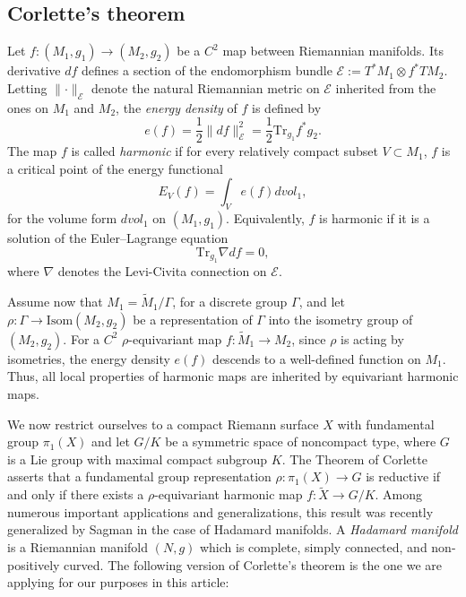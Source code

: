 \documentclass[oneside,11pt]{amsart}
\makeatletter
\theoremstyle{definition}
\theoremstyle{remark}
\let\origsection\section
\renewcommand\section{\@ifstar{\starsection}{\nostarsection}}
\newcommand\nostarsection[1]
{\sectionprelude\origsection{#1}\sectionpostlude}
\newcommand\starsection[1]
{\sectionprelude\origsection*{#1}\sectionpostlude}
\newcommand\sectionprelude{%
  \vspace{1em}
}
\newcommand\sectionpostlude{%
  \vspace{1em}
}
\numberwithin{thm}{section}
\numberwithin{equation}{section}
\makeatother
\begin{document}

\newpage
\appendix


\section{From representations to Higgs bundles.}\label{sec:Corlette_Hadamard}

\subsection{Corlette's theorem}
Let $f\colon (M_1, g_1) \to (M_2, g_2)$ 
be a $C^2$ map between Riemannian manifolds. Its derivative $df$ defines a section of the endomorphism bundle $\mathcal{E}:=T^*M_1 \otimes f^*TM_2$. Letting $\lVert \cdot \rVert _{\mathcal{E}}$ denote the natural Riemannian metric on $\mathcal{E}$ inherited from the ones on $M_1$ and $M_2$, the \emph{energy density} of $f$ is defined by 
\[e(f)=\frac{1}{2}\lVert df \rVert _{\mathcal{E}}^2=\frac{1}{2} \mathrm{Tr}_{g_1}f^*g_2.\]
The map $f$ is called \emph{harmonic} if for every relatively compact subset $V \subset M_1$, $f$ is a critical point of the energy functional
\[E_V(f)= \int_{V}e(f)dvol_1 , \]
for the volume form $dvol_1$ on $(M_1,g_1)$. Equivalently, $f$ is harmonic if it is a solution of the Euler--Lagrange equation 
\[\mathrm{Tr}_{g_1}\nabla df=0,\]
where $\nabla$ denotes the Levi-Civita connection on $\mathcal{E}$. 

Assume now that $M_1=\tilde{M}_1/\Gamma$, for a discrete group $\Gamma$, and let $\rho\colon \Gamma \to \mathrm{Isom}(M_2,g_2)$ be a representation of $\Gamma$ into the isometry group of $(M_2,g_2)$. For a $C^2$ $\rho$-equivariant map $f\colon \tilde{M}_1 \to M_2$, since $\rho$ is acting by isometries, the energy density $e(f)$ descends to a well-defined function on $M_1$. Thus, all local properties of harmonic maps are inherited by equivariant harmonic maps. 

We now restrict ourselves to a compact Riemann surface $X$ with fundamental group $\pi_1(X)$ and let $G/K$ be a symmetric space of noncompact type, where $G$ is a Lie group with maximal compact subgroup $K$. The Theorem of Corlette \cite{Corlette} asserts that a fundamental group representation $\rho \colon \pi_1(X) \to G$ is reductive if and only if there exists a $\rho$-equivariant harmonic map $f \colon \tilde{X}\to G/K$. Among  numerous important applications and generalizations, this result was recently generalized by Sagman \cite{Sagman} in the case of Hadamard manifolds. A \emph{Hadamard manifold} is a Riemannian manifold $(N,g)$ which is complete, simply connected, and non-positively curved. The following version of Corlette's theorem is the one we are applying for our purposes in this article:
\end{document}
